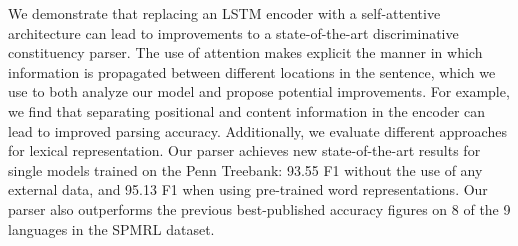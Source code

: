 We demonstrate that replacing an LSTM encoder with a self-attentive architecture can lead to improvements to a state-of-the-art discriminative constituency parser. The use of attention makes explicit the manner in which information is propagated between different locations in the sentence, which we use to both analyze our model and propose potential improvements.  For example, we find that separating positional and content information in the encoder can lead to improved parsing accuracy. Additionally, we evaluate different approaches for lexical representation. Our parser achieves new state-of-the-art results for single models trained on the Penn Treebank: 93.55 F1 without the use of any external data, and 95.13 F1 when using pre-trained word representations. Our parser also outperforms the previous best-published accuracy figures on 8 of the 9 languages in the SPMRL dataset.
